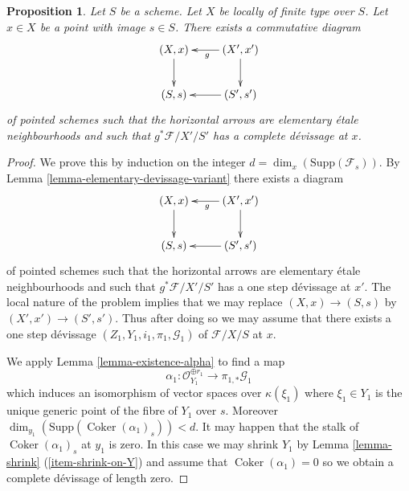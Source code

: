 \documentclass{amsart}
\theoremstyle{plain}
\newtheorem{proposition}[subsection]{Proposition}
\theoremstyle{definition}
\theoremstyle{remark}
\numberwithin{equation}{subsection}
\def\Coker{\mathop{\mathrm{Coker}}}
\begin{document}
\begin{proposition}
\label{proposition-existence-complete-at-x}
Let $S$ be a scheme.
Let $X$ be locally of finite type over $S$.
Let $x \in X$ be a point with image $s \in S$.
There exists a commutative diagram
$$
\xymatrix{
(X, x) \ar[d] & (X', x') \ar[l]^g \ar[d] \\
(S, s) & (S', s') \ar[l]
}
$$
of pointed schemes such that the horizontal
arrows are elementary \'etale neighbourhoods
and such that $g^*\mathcal{F}/X'/S'$ has a complete
d\'evissage at $x$.
\end{proposition}

\begin{proof}
We prove this by induction on the integer
$d = \dim_x(\text{Supp}(\mathcal{F}_s))$.
By
Lemma \ref{lemma-elementary-devissage-variant}
there exists a diagram
$$
\xymatrix{
(X, x) \ar[d] & (X', x') \ar[l]^g \ar[d] \\
(S, s) & (S', s') \ar[l]
}
$$
of pointed schemes such that the horizontal
arrows are elementary \'etale neighbourhoods
and such that $g^*\mathcal{F}/X'/S'$ has a one step d\'evissage at $x'$.
The local nature of the problem implies that we may replace
$(X, x) \to (S, s)$ by $(X', x') \to (S', s')$. Thus after doing so
we may assume that there exists a one step d\'evissage
$(Z_1, Y_1, i_1, \pi_1, \mathcal{G}_1)$ of $\mathcal{F}/X/S$ at $x$.

\medskip\noindent
We apply
Lemma \ref{lemma-existence-alpha}
to find a map
$$
\alpha_1 :
\mathcal{O}_{Y_1}^{\oplus r_1}
\longrightarrow
\pi_{1, *}\mathcal{G}_1
$$
which induces an isomorphism of vector spaces over $\kappa(\xi_1)$
where $\xi_1 \in Y_1$ is the unique generic point of the fibre of
$Y_1$ over $s$. Moreover
$\dim_{y_1}(\text{Supp}(\Coker(\alpha_1)_s)) < d$.
It may happen that the stalk of $\Coker(\alpha_1)_s$
at $y_1$ is zero. In this case we may shrink $Y_1$ by
Lemma \ref{lemma-shrink} (\ref{item-shrink-on-Y})
and assume that $\Coker(\alpha_1) = 0$ so we obtain a
complete d\'evissage of length zero.


\end{proof}
\end{document}
